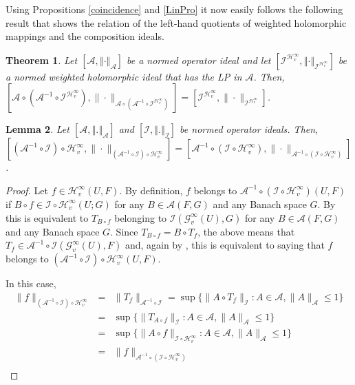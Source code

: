 \documentclass[12pt]{amsart}
\newtheorem{theorem}{Theorem}[section]
\theoremstyle{plain}
\newtheorem{lemma}[theorem]{Lemma}
\numberwithin{equation}{section}
\begin{document}
Using Propositions \ref{coincidence} and \ref{LinPro} it now easily follows the following result that shows the relation of the   left-hand quotients of weighted holomorphic mappings and the composition ideals.

\begin{theorem}
Let $\left[ \mathcal{A},\left\Vert \cdot\right\Vert _{\mathcal{A}}\right] $ be a
normed operator ideal and let $\left[ \mathcal{I}^{\mathcal{H}_{v}^{\infty
}},\left\Vert \cdot\right\Vert _{\mathcal{I}^{\mathcal{H}_{v}^{\infty }}}\right] 
$ be a normed  weighted holomorphic ideal that has the LP in $\mathcal A$. Then,
 $[\mathcal A\circ(\mathcal A^{-1}\circ\mathcal I^{\mathcal H_v^\infty}), \|\cdot\|_{ \mathcal A\circ(\mathcal A^{-1}\circ\mathcal I^{\mathcal H_v^\infty})}]= [\mathcal I^{\mathcal H_v^\infty}, \|\cdot\|_{\mathcal I^{\mathcal H_v^\infty}}]$.

\end{theorem}


\begin{lemma}\label{asoc}
Let $\left[ \mathcal{A},\left\Vert .\right\Vert _{\mathcal{A}}%
\right] $ and $\left[ \mathcal{I},\left\Vert .\right\Vert _{\mathcal{I}}%
\right] $ be  normed operator ideals. Then, $[(\mathcal A^{-1}\circ \mathcal I)\circ \mathcal H_v^\infty, \| \cdot\|_{(\mathcal A^{-1}\circ \mathcal I)\circ \mathcal H_v^\infty}]=[\mathcal A^{-1}\circ (\mathcal I\circ \mathcal H_v^\infty), \| \cdot\|_{\mathcal A^{-1}\circ (\mathcal I\circ \mathcal H_v^\infty)}]$.
\end{lemma}

\begin{proof} Let $f\in \mathcal H_v^\infty(U,F)$.
By definition, $f$ belongs to $\mathcal A^{-1}\circ (\mathcal I\circ \mathcal H_v^\infty)(U,F)$ if  $B\circ f\in \mathcal I\circ \mathcal H_v^\infty(U;G)$ for any $B\in \mathcal A(F,G)$ and any Banach space $G$. By \cite[Theorem 2.7]{CaJiKe} this is equivalent to $T_{B\circ f}$ belonging to $\mathcal I(\mathcal G_v^\infty(U),G)$ for any $B\in \mathcal A(F,G)$ and any Banach space $G$. Since $T_{B\circ f}=B\circ T_f$, the above means that $T_f \in \mathcal A^{-1}\circ \mathcal I(\mathcal G_v^\infty(U),F)$ and, again by \cite[Theorem 2.7]{CaJiKe}, this is equivalent to saying that $f$ belongs to $(\mathcal A^{-1}\circ \mathcal I)\circ \mathcal H_v^\infty(U,F)$.

In this case, 
\begin{eqnarray*}
\|f\|_{(\mathcal A^{-1}\circ \mathcal I)\circ \mathcal H_v^\infty}&=& \|T_f\|_{\mathcal A^{-1}\circ \mathcal I}=\sup\{ \|A\circ T_f\|_{\mathcal I}: A\in \mathcal A, \|A\|_{\mathcal A}\leq 1\}\\
&=&\sup\{ \|T_{A\circ f}\|_{\mathcal I}: A\in \mathcal A, \|A\|_{\mathcal A}\leq 1\}\\
&=&\sup\{ \|A\circ f\|_{\mathcal I\circ \mathcal H_v^\infty}: A\in \mathcal A, \|A\|_{\mathcal A}\leq 1\}\\
&=& \|f\|_{\mathcal A^{-1}\circ (\mathcal I\circ \mathcal H_v^\infty)}\\
\end{eqnarray*}
\end{proof}
\end{document}
